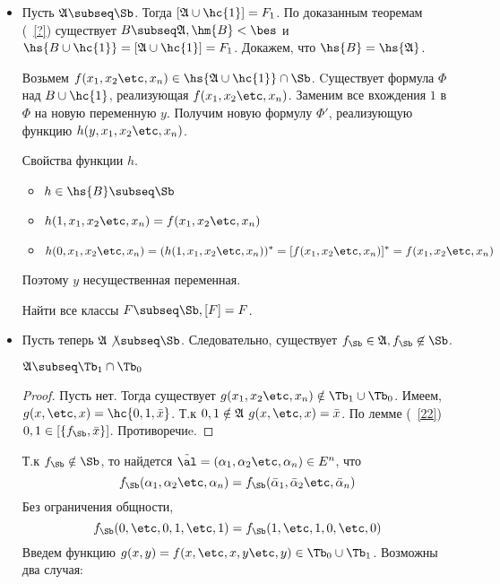 \documentclass[unicode, 10pt, a4paper, oneside, fleqn]{article}
\begin{document}
\begin{itemize}
\item Пусть $\ag\subseq\Sb$. 
  Тогда $[\ag\cup\hc{1}] = F_1$. По доказанным теоремам (~\ref{?})
  существует $B\subseq\ag, \hm{B}<\bes$ и $\hs{B\cup\hc{1}} = [\ag\cup\hc{1}]=F_1$.
  Докажем, что $\hs{B}=\hs{\ag}$.\par
  Возьмем $f(\set[x]{n})\in\hs{\ag\cup\hc{1}}\cap\Sb$.
  Cуществует формула $\Phi$ над $B\cup\hc{1}$, реализующая $f(\set[x]{n})$.
  Заменим все вхождения $1$ в $\Phi$ на новую переменную $y$. 
  Получим новую формулу $\Phi'$, реализующую функцию $h(y,\set[x]{n})$.
  \par Свойства функции $h$.
  \begin{itemize}
    \item $\displaystyle h\in \hs{B} \subseq \Sb$
    \item $\displaystyle h(1,\set[x]{n}) = f(\set[x]{n})$
    \item $\displaystyle h(0,\set[x]{n}) = (h(1,\set[x]{n}))^* = [f(\set[x]{n})]^*=f(\set[x]{n})$
  \end{itemize}
  Поэтому $y$ несущественная переменная.
  \begin{problem}
    Найти все классы $F\subseq\Sb,[F]=F$.
  \end{problem}
  \item Пусть теперь $\ag\not\subseq\Sb$. 
    Следовательно, существует $\fS\in\ag,\fS\not\in\Sb$.
    \begin{lemma}
      $\displaystyle \ag\subseq\Tb_1\cap\Tb_0$
    \end{lemma}
    \begin{proof}
      Пусть нет. Тогда существует $g(\set[x]{n})\notin\Tb_1\cup\Tb_0$.
      Имеем, $g(x,\etc,x) = \hc{ 0, 1, \bar x}$. Т.к $0,1\notin\mathfrak{A}$ $g(x,\etc,x)=\bar x$.
      По лемме (~\ref{22})  $0,1 \in \cls{\fS,\bar x}$. Противоречиe.
    \end{proof}
    Т.к $\fS\notin\Sb$, то найдется $\alt = (\set{n})\in E^n$, что
    \begin{displaymath}
      \fS(\set{n}) = \fS(\set[\bar \alpha]{n})
    \end{displaymath}
      Без ограничения общности,
      \begin{displaymath}
        \fS(0,\etc,0,1,\etc,1) = \fS(1,\etc,1,0,\etc, 0)
      \end{displaymath}
      Введем функцию  $ g(x,y)=f(x,\etc,x,y\etc,y) \in\Tb_0\cup\Tb_1$.
      Возможны два случая:\par
      \begin{enumerate}

\end{enumerate}
\end{itemize}
\end{document}
